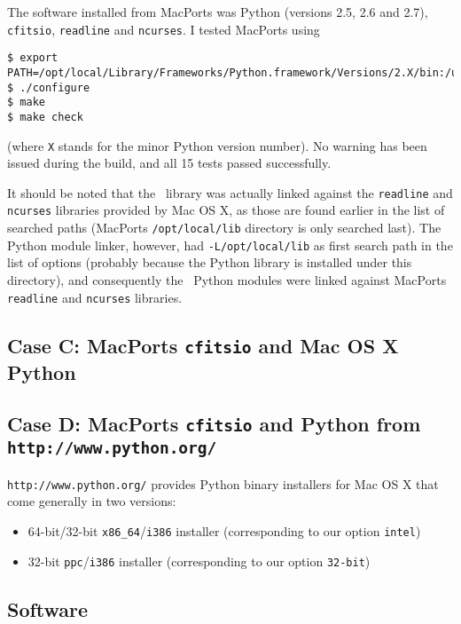 \documentclass{article}[12pt,a4]
\begin{document}
The software installed from MacPorts was Python (versions 2.5, 2.6 and 2.7), {\tt cfitsio},
{\tt readline} and {\tt ncurses}.
I tested MacPorts using
{\small\begin{verbatim}
$ export PATH=/opt/local/Library/Frameworks/Python.framework/Versions/2.X/bin:/usr/bin:/bin:/usr/sbin:/sbin
$ ./configure
$ make
$ make check
\end{verbatim}}
(where {\tt X} stands for the minor Python version number).
No warning has been issued during the build, and all 15 tests passed successfully.

It should be noted that the \this\ library was actually linked against the {\tt readline} and {\tt ncurses}
libraries provided by Mac OS X, as those are found earlier in the list of searched paths (MacPorts
{\tt /opt/local/lib} directory is only searched last).
The Python module linker, however, had {\tt -L/opt/local/lib} as first search path in the list of
options (probably because the Python library is installed under this directory), and consequently
the \this\ Python modules were linked against MacPorts {\tt readline} and {\tt ncurses} libraries.


\subsection{Case C: MacPorts {\tt cfitsio} and Mac OS X Python}


\subsection{Case D: MacPorts {\tt cfitsio} and Python from {\tt http://www.python.org/}}

{\tt http://www.python.org/} provides Python binary installers for Mac OS X that come generally
in two versions:
\begin{itemize}
\item 64-bit/32-bit {\tt x86\_64}/{\tt i386} installer (corresponding to our option {\tt intel})
\item 32-bit {\tt ppc}/{\tt i386} installer (corresponding to our option {\tt 32-bit})
\end{itemize}



\subsection{Software}
\end{document}
